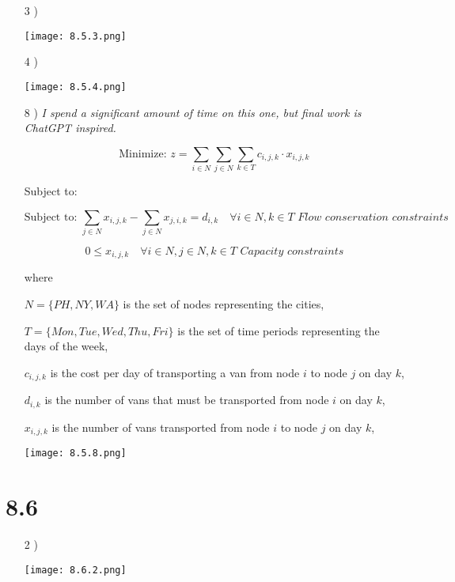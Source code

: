\documentclass{article}
\begin{document}
\begin{enumerate}
\item[3 )]\begin{center}\texttt{[image: 8.5.3.png]}\end{center}

\item[4 )]\begin{center}\texttt{[image: 8.5.4.png]}\end{center}

\item[8 )] \emph{I spend a significant amount of time on this one, but final work is ChatGPT inspired.}



\[\text{Minimize: }z = \sum_{i \in N} \sum_{j \in N} \sum_{k \in T} c_{i,j,k} \cdot x_{i,j,k}\]

Subject to:

\[\text{Subject to: }\sum_{j \in N} x_{i,j,k} - \sum_{j \in N} x_{j,i,k} = d_{i,k} \quad \forall i \in N, k \in T \textit{ Flow conservation constraints}\]

\[0 \leq x_{i,j,k} \quad \forall i \in N, j \in N, k \in T \textit{ Capacity constraints}\]

where

$N = \{PH, NY, WA\}$ is the set of nodes representing the cities,

$T = \{Mon, Tue, Wed, Thu, Fri\}$ is the set of time periods representing the days of the week,

$c_{i,j,k}$ is the cost per day of transporting a van from node $i$ to node $j$ on day $k$,

$d_{i,k}$ is the number of vans that must be transported from node $i$ on day $k$,

$x_{i,j,k}$ is the number of vans transported from node $i$ to node $j$ on day $k$,

\begin{center}\texttt{[image: 8.5.8.png]}\end{center}


\end{enumerate}

\section*{8.6}
\begin{enumerate}
\item[2 )]\begin{center}\texttt{[image: 8.6.2.png]}\end{center}
\end{enumerate}
\end{document}
